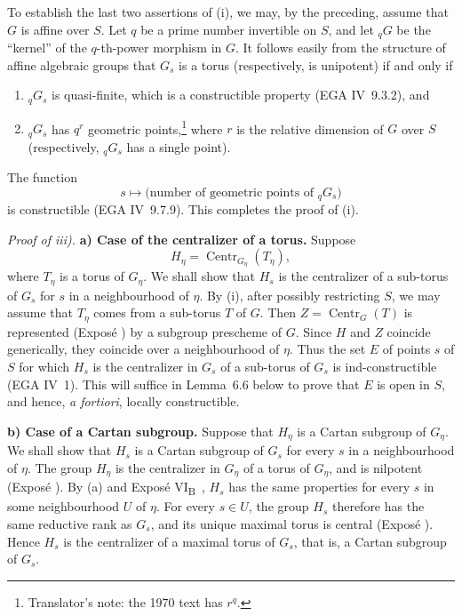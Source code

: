 To establish the last two assertions of (i), we may, by the
preceding, assume that \(G\) is affine over \(S\). Let \(q\) be a
prime number invertible on \(S\), and let \({}_qG\) be the
``kernel'' of the \(q\)-th-power morphism in \(G\). It follows
easily from the structure of affine algebraic groups that \(G_s\)
is a torus (respectively, is unipotent) if and only if
\begin{enumerate}
\renewcommand{\labelenumi}{\textup{\alph{enumi})}}
\item \({}_qG_s\) is quasi-finite, which is a constructible
property (EGA IV~9.3.2), and
\item \({}_qG_s\) has \(q^r\) geometric points,\footnote{Translator's note: the 1970 text has \(r^q\).} where \(r\) is the
relative dimension of \(G\) over \(S\) (respectively,
\({}_qG_s\) has a single point).
\end{enumerate}
The function
\[
 s\longmapsto
 \bigl(\text{number of geometric points of }{}_qG_s\bigr)
\]
is constructible (EGA IV~9.7.9). This completes the proof of (i).

\emph{Proof of iii).} \textbf{a) Case of the centralizer of a
torus.} Suppose
\[
  H_{\eta}=\operatorname{Centr}_{G_{\eta}}(T_{\eta}),
\]
where \(T_{\eta}\) is a torus of \(G_{\eta}\). We shall show that
\(H_s\) is the centralizer of a sub-torus of \(G_s\) for \(s\) in a
neighbourhood of \(\eta\). By (i), after possibly restricting \(S\),
we may assume that \(T_{\eta}\) comes from a sub-torus \(T\) of
\(G\). Then \(Z=\operatorname{Centr}_{G}(T)\) is represented
(Exposé ) by a subgroup prescheme of \(G\). Since \(H\) and
\(Z\) coincide generically, they coincide over a neighbourhood of
\(\eta\). Thus the set \(E\) of points \(s\) of \(S\) for which
\(H_s\) is the centralizer in \(G_s\) of a sub-torus of \(G_s\) is
ind-constructible (EGA IV~1). This will suffice in Lemma~6.6 below
to prove that \(E\) is open in \(S\), and hence, \emph{a fortiori},
locally constructible.

\textbf{b) Case of a Cartan subgroup.} Suppose that \(H_{\eta}\) is
a Cartan subgroup of \(G_{\eta}\). We shall show that \(H_s\) is a
Cartan subgroup of \(G_s\) for every \(s\) in a neighbourhood of
\(\eta\). The group \(H_{\eta}\) is the centralizer in \(G_{\eta}\)
of a torus of \(G_{\eta}\), and is nilpotent (Exposé ). By
(a) and Exposé VI\textsubscript{B}~, \(H_s\) has the same
properties for every \(s\) in some neighbourhood \(U\) of \(\eta\).
For every \(s\in U\), the group \(H_s\) therefore has the same
reductive rank as \(G_s\), and its unique maximal torus is central
(Exposé ). Hence \(H_s\) is the centralizer of a maximal torus
of \(G_s\), that is, a Cartan subgroup of \(G_s\).

